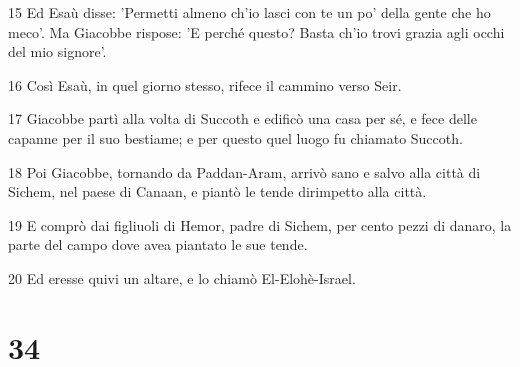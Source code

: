\par 15 Ed Esaù disse: 'Permetti almeno ch'io lasci con te un po' della gente che ho meco'. Ma Giacobbe rispose: 'E perché questo? Basta ch'io trovi grazia agli occhi del mio signore'.
\par 16 Così Esaù, in quel giorno stesso, rifece il cammino verso Seir.
\par 17 Giacobbe partì alla volta di Succoth e edificò una casa per sé, e fece delle capanne per il suo bestiame; e per questo quel luogo fu chiamato Succoth.
\par 18 Poi Giacobbe, tornando da Paddan-Aram, arrivò sano e salvo alla città di Sichem, nel paese di Canaan, e piantò le tende dirimpetto alla città.
\par 19 E comprò dai figliuoli di Hemor, padre di Sichem, per cento pezzi di danaro, la parte del campo dove avea piantato le sue tende.
\par 20 Ed eresse quivi un altare, e lo chiamò El-Elohè-Israel.

\chapter{34}

